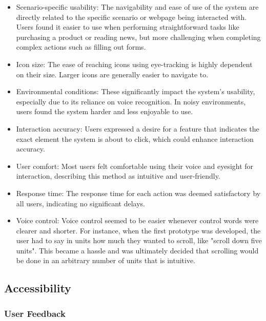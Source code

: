 \begin{itemize}
    \item Scenario-specific usability: The navigability and ease of use of the system are directly related to the specific scenario or webpage being interacted with. Users found it easier to use when performing straightforward tasks like purchasing a product or reading news, but more challenging when completing complex actions such as filling out forms.
    \item Icon size: The ease of reaching icons using eye-tracking is highly dependent on their size. Larger icons are generally easier to navigate to.
    \item Environmental conditions: These significantly impact the system's usability, especially due to its reliance on voice recognition. In noisy environments, users found the system harder and less enjoyable to use.
    \item Interaction accuracy: Users expressed a desire for a feature that indicates the exact element the system is about to click, which could enhance interaction accuracy.
    \item User comfort: Most users felt comfortable using their voice and eyesight for interaction, describing this method as intuitive and user-friendly.
    \item Response time: The response time for each action was deemed satisfactory by all users, indicating no significant delays.
    \item Voice control: Voice control seemed to be easier whenever control words were clearer and shorter. For instance, when the first prototype was developed, the user had to say in units how much they wanted to scroll, like "scroll down five units". This became a hassle and was ultimately decided that scrolling would be done in an arbitrary number of units that is intuitive.
\end{itemize}


\subsection{Accessibility}

\subsubsection{User Feedback}

